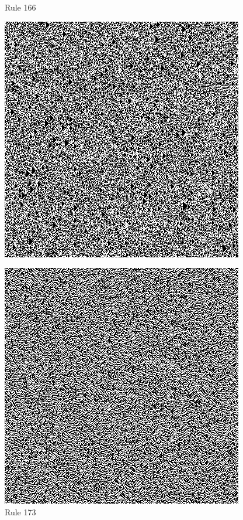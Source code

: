 \documentclass{article}
\begin{document}
\begin{figure}[H]
  \begin{center}
    \begin{minipage}{0.48\textwidth}
      \caption{Rule 166}
      \label{fig:figure8}
      \centering
      \includegraphics[scale=.5]{166.png}
    \end{minipage}
    \begin{minipage}{0.48\textwidth}
      \caption{Rule 173}
      \label{fig:figure9}
      \centering
      \includegraphics[scale=.5]{173.png}
    \end{minipage}
    \begin{minipage}{0.48\textwidth}

\end{minipage}
\end{center}
\end{figure}
\end{document}
